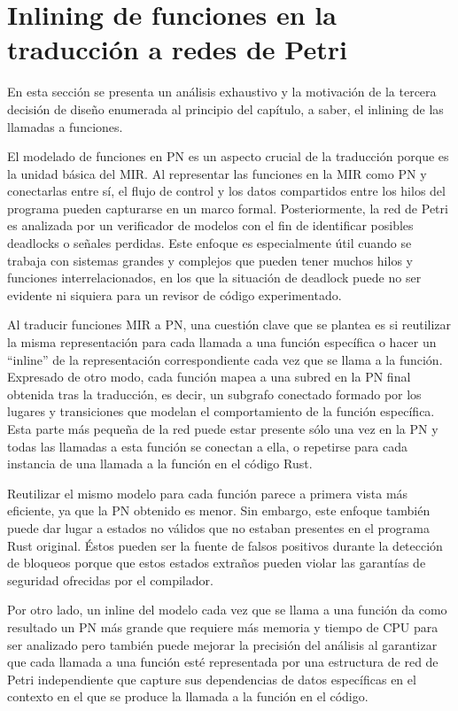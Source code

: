 \section{Inlining de funciones en la traducción a redes de Petri}
\label{sec:function-inlining}

En esta sección se presenta un análisis exhaustivo y la motivación de la tercera decisión de
diseño enumerada al principio del capítulo, a saber, el inlining de las llamadas a funciones.

El modelado de funciones en \acrshort{PN} es un aspecto crucial de la traducción porque es la unidad
básica del \acrshort{MIR}. Al representar las funciones en la \acrshort{MIR} como \acrshort{PN}
y conectarlas entre sí, el flujo de control y los datos compartidos
entre los hilos del programa pueden capturarse en un marco formal.
Posteriormente, la red de Petri es analizada por un verificador de modelos con el fin de
identificar posibles deadlocks o señales perdidas. Este enfoque es especialmente útil
cuando se trabaja con sistemas grandes y complejos que pueden tener muchos hilos y funciones
interrelacionados, en los que la situación de deadlock puede no ser evidente ni siquiera para un
revisor de código experimentado.

Al traducir funciones \acrshort{MIR} a \acrshort{PN},
una cuestión clave que se plantea es si reutilizar la misma
representación para cada llamada a una función específica o hacer un ``inline'' de la representación
correspondiente cada vez que se llama a la función. Expresado de otro modo, cada función
mapea a una subred en la \acrshort{PN} final obtenida tras la traducción, es decir, un subgrafo conectado
formado por los lugares y transiciones que modelan el comportamiento de la función
específica.
Esta parte más pequeña de la red puede estar presente sólo una vez en la \acrshort{PN} y todas
las llamadas a esta función se conectan a ella, o repetirse para cada instancia de una llamada a
la función en el código Rust.

Reutilizar el mismo modelo para cada función parece a primera vista más eficiente, ya que la
\acrshort{PN} obtenido es menor. Sin embargo, este enfoque también puede dar lugar a estados no válidos
que no estaban presentes en el programa Rust original. Éstos pueden ser la fuente de falsos
positivos durante la detección de bloqueos porque que estos estados extraños pueden violar las
garantías de seguridad ofrecidas por el compilador.

Por otro lado, un inline del modelo cada vez que se llama a una función da como resultado un \acrshort{PN}
más grande que requiere más memoria y tiempo de \acrshort{CPU} para ser analizado pero también
puede mejorar la precisión del análisis al garantizar que cada llamada a una función esté
representada por una estructura de red de Petri independiente que capture sus dependencias de
datos específicas en el contexto en el que se produce la llamada a la función en el código.

